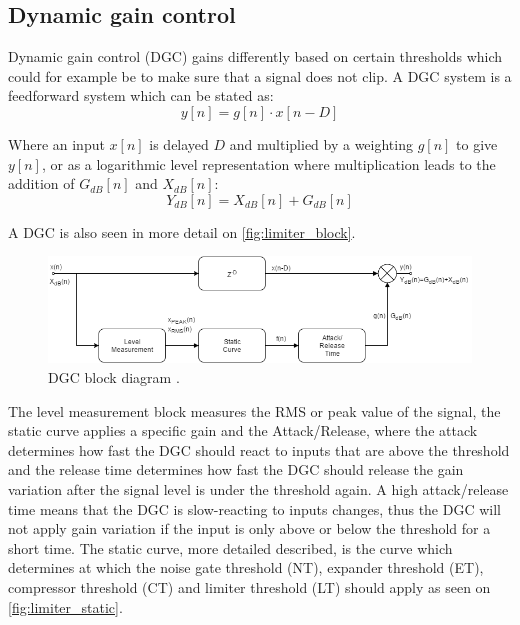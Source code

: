 \subsection*{Dynamic gain control}
Dynamic gain control (DGC) gains differently based on certain thresholds which could for example be to make sure that a signal does not clip. A DGC system is a feedforward system which can be stated as:
\begin{equation}
y[n] = g[n]\cdot x[n-D]
\end{equation}

Where an input $x[n]$ is delayed $D$ and multiplied by a weighting $g[n]$ to give $y[n]$, or as a logarithmic level representation where multiplication leads to the addition of $G_{dB}[n]$ and $X_{dB}[n]$:
\begin{equation}
Y_{dB}[n] = X_{dB}[n] + G_{dB}[n]
\end{equation}

A DGC is also seen in more detail on \autoref{fig:limiter_block}.

\begin{figure}[H]
\centering
\includegraphics[width=1\textwidth]{figures/Limiter_block.png}
\caption{DGC block diagram \citep{dynamicGainPic}.}
\label{fig:limiter_block}
\end{figure}   


The level measurement block measures the RMS or peak value of the signal, the static curve applies a specific gain and the Attack/Release, where the attack determines how fast the DGC should react to inputs that are above the threshold and the release time determines how fast the DGC should release the gain variation after the signal level is under the threshold again. A high attack/release time means that the DGC is slow-reacting to inputs changes, thus the DGC will not apply gain variation if the input is only above or below the threshold for a short time.
The static curve, more detailed described, is the curve which determines at which the noise gate threshold (NT), expander threshold (ET), compressor threshold (CT) and limiter threshold (LT) should apply as seen on \autoref{fig:limiter_static}. 

